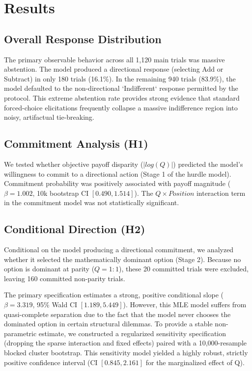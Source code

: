 \documentclass[10pt,journal,compsoc]{IEEEtran}
\begin{document}
\section{Results}
\label{sec:results}

\subsection{Overall Response Distribution}
The primary observable behavior across all 1,120 main trials was massive abstention. The model produced a directional response (selecting Add or Subtract) in only 180 trials (16.1\%). In the remaining 940 trials (83.9\%), the model defaulted to the non-directional `Indifferent` response permitted by the protocol. This extreme abstention rate provides strong evidence that standard forced-choice elicitations frequently collapse a massive indifference region into noisy, artifactual tie-breaking.

\subsection{Commitment Analysis (H1)}
We tested whether objective payoff disparity ($|log(Q)|$) predicted the model's willingness to commit to a directional action (Stage 1 of the hurdle model). Commitment probability was positively associated with payoff magnitude ($\beta = 1.002$, 10k bootstrap CI $[0.490, 1.514]$). The $Q \times Position$ interaction term in the commitment model was not statistically significant.

\subsection{Conditional Direction (H2)}
Conditional on the model producing a directional commitment, we analyzed whether it selected the mathematically dominant option (Stage 2). Because no option is dominant at parity ($Q=1:1$), these 20 committed trials were excluded, leaving 160 committed non-parity trials.

The primary specification estimates a strong, positive conditional slope ($\beta = 3.319$, 95\% Wald CI $[1.189, 5.449]$). However, this MLE model suffers from quasi-complete separation due to the fact that the model never chooses the dominated option in certain structural dilemmas. To provide a stable non-parametric estimate, we constructed a regularized sensitivity specification (dropping the sparse interaction and fixed effects) paired with a 10,000-resample blocked cluster bootstrap. This sensitivity model yielded a highly robust, strictly positive confidence interval (CI $[0.845, 2.161]$ for the marginalized effect of Q). 
\end{document}
